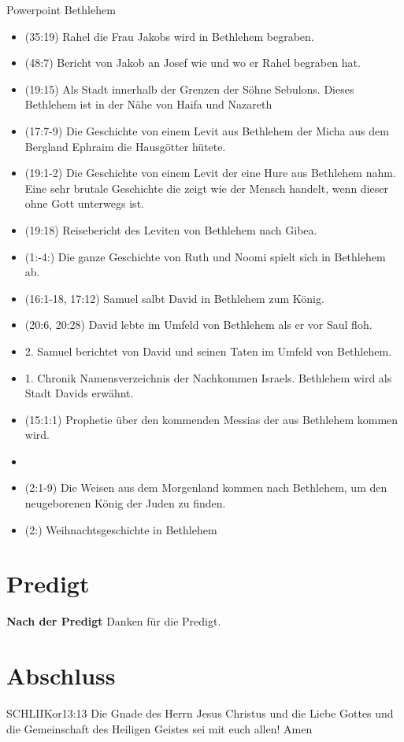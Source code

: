 \documentclass[fontsize=14pt]{mybib}
\begin{document}
Powerpoint Bethlehem\\
\begin{itemize}   
    \item {}(35:19) Rahel die Frau Jakobs wird in Bethlehem begraben.
    \item {}(48:7) Bericht von Jakob an Josef wie und wo er Rahel begraben hat.
    \item {}(19:15) Als Stadt innerhalb der Grenzen der Söhne Sebulons. Dieses Bethlehem ist in der Nähe von Haifa und Nazareth 
    \item {}(17:7-9) Die Geschichte von einem Levit aus Bethlehem der Micha aus dem Bergland Ephraim die Hausgötter hütete.
    \item {}(19:1-2) Die Geschichte von einem Levit der eine Hure aus Bethlehem nahm. Eine sehr brutale Geschichte die zeigt wie der Mensch handelt, wenn dieser ohne Gott unterwegs ist. 
    \item {}(19:18) Reisebericht des Leviten von Bethlehem nach Gibea. 
    \item {}(1:-4:) Die ganze Geschichte von Ruth und Noomi spielt sich in Bethlehem ab.
    \item {}(16:1-18, 17:12) Samuel salbt David in Bethlehem zum König.
    \item {}(20:6, 20:28) David lebte im Umfeld von Bethlehem als er vor Saul floh.
    \item 2. Samuel berichtet von David und seinen Taten im Umfeld von Bethlehem.
    \item 1. Chronik Namensverzeichnis der Nachkommen Israels. Bethlehem wird als Stadt Davids erwähnt.
    \item {}(15:1:1) Prophetie über den kommenden Messias der aus Bethlehem kommen wird.
    \item 
    \item {}(2:1-9) Die Weisen aus dem Morgenland kommen nach Bethlehem, um den neugeborenen König der Juden zu finden.
    \item {}(2:) Weihnachtsgeschichte in Bethlehem
\end{itemize}

\section{Predigt}
\textbf{Nach der Predigt}\newline
Danken für die Predigt.\newline

\section{Abschluss}


\beten{}

\begin{bibelbox}{SCHL}{IIKor}{13:13}
    Die Gnade des Herrn Jesus Christus und die Liebe Gottes und die Gemeinschaft des Heiligen Geistes sei mit euch allen! Amen
\end{bibelbox}
\end{document}
